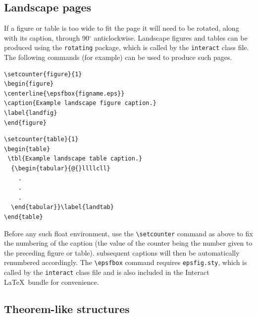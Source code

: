 \documentclass[]{interact}
\theoremstyle{plain}%
\theoremstyle{definition}
\theoremstyle{remark}
\begin{document}
\subsection{Landscape pages}

If a figure or table is too wide to fit the page it will need to be rotated, along with its caption, through 90$^{\circ}$ anticlockwise.
Landscape figures and tables can be produced using the \verb"rotating" package, which is called by the \texttt{interact} class file.
The following commands (for example) can be used to produce such pages.
\begin{verbatim}
\setcounter{figure}{1}
\begin{figure}
\centerline{\epsfbox{figname.eps}}
\caption{Example landscape figure caption.}
\label{landfig}
\end{figure}
\end{verbatim}
\begin{verbatim}
\setcounter{table}{1}
\begin{table}
 \tbl{Example landscape table caption.}
  {\begin{tabular}{@{}llllcll}
    .
    .
    .
  \end{tabular}}\label{landtab}
\end{table}
\end{verbatim}
Before any such float environment, use the \verb"\setcounter" command as above to fix the numbering of the caption (the value of the counter being the number given to the preceding figure or table). subsequent captions will then be automatically renumbered accordingly. The \verb"\epsfbox" command requires \verb"epsfig.sty", which is called by the \texttt{interact} class file and is also included in the \textsf{Interact} \LaTeX\ bundle for convenience.


\subsection{Theorem-like structures}
\end{document}
